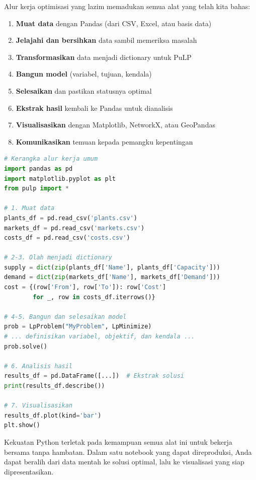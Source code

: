 Alur kerja optimisasi yang lazim memadukan semua alat yang telah kita bahas:

\begin{enumerate}
\item \textbf{Muat data} dengan Pandas (dari CSV, Excel, atau basis data)
\item \textbf{Jelajahi dan bersihkan} data sambil memeriksa masalah
\item \textbf{Transformasikan} data menjadi dictionary untuk PuLP
\item \textbf{Bangun model} (variabel, tujuan, kendala)
\item \textbf{Selesaikan} dan pastikan statusnya optimal
\item \textbf{Ekstrak hasil} kembali ke Pandas untuk dianalisis
\item \textbf{Visualisasikan} dengan Matplotlib, NetworkX, atau GeoPandas
\item \textbf{Komunikasikan} temuan kepada pemangku kepentingan
\end{enumerate}

\begin{lstlisting}[language=Python]
# Kerangka alur kerja umum
import pandas as pd
import matplotlib.pyplot as plt
from pulp import *

# 1. Muat data
plants_df = pd.read_csv('plants.csv')
markets_df = pd.read_csv('markets.csv')
costs_df = pd.read_csv('costs.csv')

# 2-3. Olah menjadi dictionary
supply = dict(zip(plants_df['Name'], plants_df['Capacity']))
demand = dict(zip(markets_df['Name'], markets_df['Demand']))
cost = {(row['From'], row['To']): row['Cost']
        for _, row in costs_df.iterrows()}

# 4-5. Bangun dan selesaikan model
prob = LpProblem("MyProblem", LpMinimize)
# ... definisikan variabel, objektif, dan kendala ...
prob.solve()

# 6. Analisis hasil
results_df = pd.DataFrame([...])  # Ekstrak solusi
print(results_df.describe())

# 7. Visualisasikan
results_df.plot(kind='bar')
plt.show()
\end{lstlisting}

Kekuatan Python terletak pada kemampuan semua alat ini untuk bekerja bersama tanpa hambatan. Dalam satu notebook yang dapat direproduksi, Anda dapat beralih dari data mentah ke solusi optimal, lalu ke visualisasi yang siap dipresentasikan.

